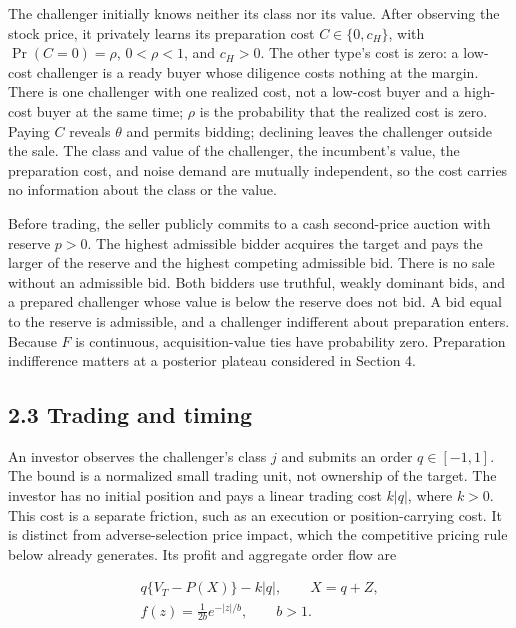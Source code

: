 The challenger initially knows neither its class nor its value. After
observing the stock price, it privately learns its preparation cost
\(C\in\{0,c_H\}\), with \(\Pr(C=0)=\rho\), \(0<\rho<1\), and
\(c_H>0\). The other type's cost is zero: a low-cost
challenger is a ready buyer whose diligence costs nothing at the margin.
There is one challenger with one realized cost, not a low-cost buyer and
a high-cost buyer at the same time; \(\rho\) is the probability that the
realized cost is zero. Paying \(C\) reveals \(\theta\) and permits
bidding; declining leaves the challenger outside the sale. The class and
value of the challenger, the incumbent's value, the preparation cost,
and noise demand are mutually independent, so the cost carries no
information about the class or the value.

Before trading, the seller publicly commits to a cash second-price
auction with reserve \(p>0\). The highest admissible bidder acquires the
target and pays the larger of the reserve and the highest competing
admissible bid. There is no sale without an admissible bid. Both bidders
use truthful, weakly dominant bids, and a prepared challenger whose
value is below the reserve does not bid. A bid equal to the reserve is
admissible, and a challenger indifferent about preparation enters.
Because \(F\) is continuous, acquisition-value ties have probability
zero. Preparation indifference matters at a posterior plateau considered
in Section 4.

\subsection{2.3 Trading and timing}\label{sec-trading-and-timing}

An investor observes the challenger's class \(j\) and submits an order
\(q\in[-1,1]\). The bound is a normalized small trading unit, not
ownership of the target. The investor has no initial position and pays
a linear trading cost \(k|q|\), where \(k>0\). This cost is a separate
friction, such as an execution or position-carrying cost. It is
distinct from adverse-selection price impact, which the competitive
pricing rule below already generates. Its profit and aggregate order
flow are

\[
\begin{gathered}
q\{V_T-P(X)\}-k|q|,\qquad X=q+Z,\\
f(z)=\frac{1}{2b}e^{-|z|/b},\qquad b>1.
\end{gathered}
\tag{2}\label{eq:paper-2}
\]

